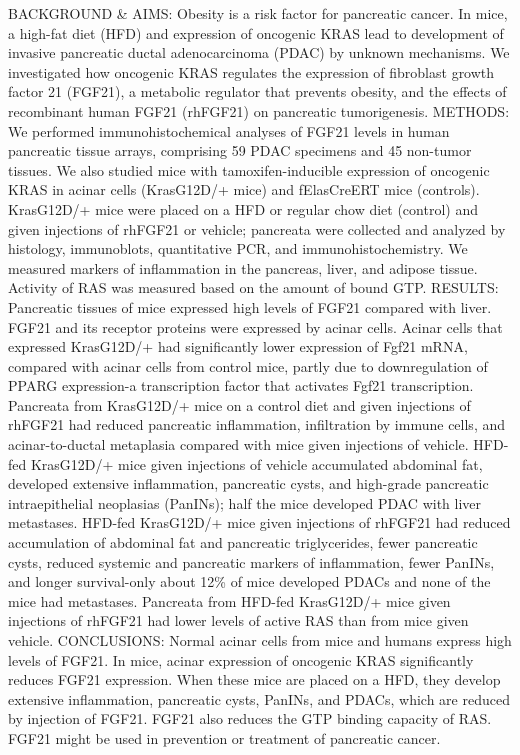 \documentclass[]{article}
\begin{document}
BACKGROUND \& AIMS: Obesity is a risk factor for pancreatic cancer. In
mice, a high-fat diet (HFD) and expression of oncogenic KRAS lead to
development of invasive pancreatic ductal adenocarcinoma (PDAC) by
unknown mechanisms. We investigated how oncogenic KRAS regulates the
expression of fibroblast growth factor 21 (FGF21), a metabolic regulator
that prevents obesity, and the effects of recombinant human FGF21
(rhFGF21) on pancreatic tumorigenesis. METHODS: We performed
immunohistochemical analyses of FGF21 levels in human pancreatic tissue
arrays, comprising 59 PDAC specimens and 45 non-tumor tissues. We also
studied mice with tamoxifen-inducible expression of oncogenic KRAS in
acinar cells (KrasG12D/+ mice) and fElasCreERT mice (controls).
KrasG12D/+ mice were placed on a HFD or regular chow diet (control) and
given injections of rhFGF21 or vehicle; pancreata were collected and
analyzed by histology, immunoblots, quantitative PCR, and
immunohistochemistry. We measured markers of inflammation in the
pancreas, liver, and adipose tissue. Activity of RAS was measured based
on the amount of bound GTP. RESULTS: Pancreatic tissues of mice
expressed high levels of FGF21 compared with liver. FGF21 and its
receptor proteins were expressed by acinar cells. Acinar cells that
expressed KrasG12D/+ had significantly lower expression of Fgf21 mRNA,
compared with acinar cells from control mice, partly due to
downregulation of PPARG expression-a transcription factor that activates
Fgf21 transcription. Pancreata from KrasG12D/+ mice on a control diet
and given injections of rhFGF21 had reduced pancreatic inflammation,
infiltration by immune cells, and acinar-to-ductal metaplasia compared
with mice given injections of vehicle. HFD-fed KrasG12D/+ mice given
injections of vehicle accumulated abdominal fat, developed extensive
inflammation, pancreatic cysts, and high-grade pancreatic
intraepithelial neoplasias (PanINs); half the mice developed PDAC with
liver metastases. HFD-fed KrasG12D/+ mice given injections of rhFGF21
had reduced accumulation of abdominal fat and pancreatic triglycerides,
fewer pancreatic cysts, reduced systemic and pancreatic markers of
inflammation, fewer PanINs, and longer survival-only about 12\% of mice
developed PDACs and none of the mice had metastases. Pancreata from
HFD-fed KrasG12D/+ mice given injections of rhFGF21 had lower levels of
active RAS than from mice given vehicle. CONCLUSIONS: Normal acinar
cells from mice and humans express high levels of FGF21. In mice, acinar
expression of oncogenic KRAS significantly reduces FGF21 expression.
When these mice are placed on a HFD, they develop extensive
inflammation, pancreatic cysts, PanINs, and PDACs, which are reduced by
injection of FGF21. FGF21 also reduces the GTP binding capacity of RAS.
FGF21 might be used in prevention or treatment of pancreatic cancer.
\end{document}
